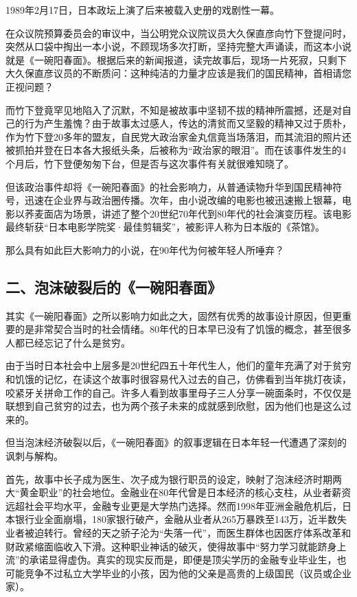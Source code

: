 1989年2月17日，日本政坛上演了后来被载入史册的戏剧性一幕。

在众议院预算委员会的审议中，当公明党众议院议员大久保直彦向竹下登提问时，突然从口袋中掏出一本小说，不顾现场多次打断，坚持完整大声诵读，而这本小说就是《一碗阳春面》。根据后来的新闻报道，读完故事后，现场一片死寂，只剩下大久保直彦议员的不断质问：这种纯洁的力量才应该是我们的国民精神，首相请您正视问题？

而竹下登竟罕见地陷入了沉默，不知是被故事中坚韧不拔的精神所震撼，还是对自己的行为产生羞愧？由于故事太过感人，传达的清贫而又坚毅的精神又过于质朴，作为竹下登20多年的盟友，自民党大政治家金丸信竟当场落泪，而其流泪的照片还被抓拍并登在日本各大报纸头条，后被称为“政治家的眼泪”。而在该事件发生的4个月后，竹下登便匆匆下台，但是否与这次事件有关就很难知晓了。

但该政治事件却将《一碗阳春面》的社会影响力，从普通读物升华到国民精神符号，迅速在企业界与政治圈传播。次年，由小说改编的电影也被迅速搬上银幕，电影以荞麦面店为场景，讲述了整个20世纪70年代到80年代的社会演变历程。该电影最终斩获“日本电影学院奖·最佳剪辑奖”，被影评人称为日本版的《茶馆》。

那么具有如此巨大影响力的小说，在90年代为何被年轻人所唾弃？

\subsection{二、泡沫破裂后的《一碗阳春面》}

其实《一碗阳春面》之所以影响力如此之大，固然有优秀的故事设计原因，但更重要的是非常契合当时的社会情绪。80年代的日本早已没有了饥饿的概念，甚至很多人都已经忘记了什么是贫穷。

由于当时日本社会中上层多是20世纪四五十年代生人，他们的童年充满了对于贫穷和饥饿的记忆，在读这个故事时很容易代入过去的自己，仿佛看到当年挑灯夜读，咬紧牙关拼命工作的自己。许多人看到故事里母子三人分享一碗面条时，不仅仅是联想到自己贫穷的过去，也为两个孩子未来的成就感到欣慰，因为他们也是这么过来的。

但当泡沫经济破裂以后，《一碗阳春面》的叙事逻辑在日本年轻一代遭遇了深刻的讽刺与解构。

首先，故事中长子成为医生、次子成为银行职员的设定，映射了泡沫经济时期两大“黄金职业”的社会地位。金融业在80年代曾是日本经济的核心支柱，从业者薪资远超社会平均水平，金融专业更是大学热门选择。然而1998年亚洲金融危机后，日本银行业全面崩塌，180家银行破产，金融从业者从265万暴跌至143万，近半数失业者被迫转行。曾经的天之骄子沦为“失落一代”，而医生群体也因医疗体系改革和财政紧缩面临收入下滑。这种职业神话的破灭，使得故事中“努力学习就能跻身上流”的承诺显得虚伪。真实的现实反而是，即便是顶尖学历的金融专业毕业生，也可能竞争不过私立大学毕业的小孩，因为他的父亲是高贵的上级国民（议员或企业家）。

